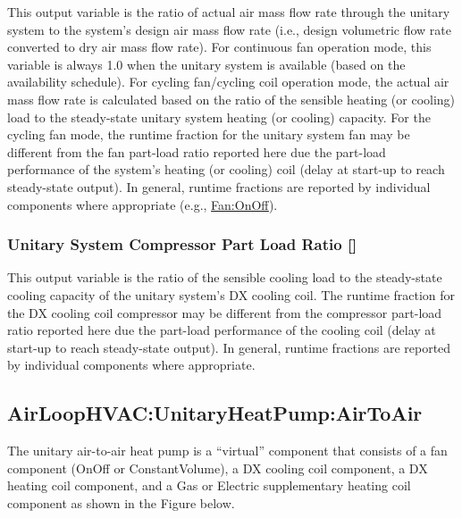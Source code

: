 This output variable is the ratio of actual air mass flow rate through the unitary system to the system's design air mass flow rate (i.e., design volumetric flow rate converted to dry air mass flow rate). For continuous fan operation mode, this variable is always 1.0 when the unitary system is available (based on the availability schedule). For cycling fan/cycling coil operation mode, the actual air mass flow rate is calculated based on the ratio of the sensible heating (or cooling) load to the steady-state unitary system heating (or cooling) capacity. For the cycling fan mode, the runtime fraction for the unitary system fan may be different from the fan part-load ratio reported here due the part-load performance of the system's heating (or cooling) coil (delay at start-up to reach steady-state output). In general, runtime fractions are reported by individual components where appropriate (e.g., \hyperref[fanonoff]{Fan:OnOff}).

\subsubsection{Unitary System Compressor Part Load Ratio {[]}}\label{unitary-system-compressor-part-load-ratio-1}

This output variable is the ratio of the sensible cooling load to the steady-state cooling capacity of the unitary system's DX cooling coil. The runtime fraction for the DX cooling coil compressor may be different from the compressor part-load ratio reported here due the part-load performance of the cooling coil (delay at start-up to reach steady-state output). In general, runtime fractions are reported by individual components where appropriate.

\subsection{AirLoopHVAC:UnitaryHeatPump:AirToAir}\label{airloophvacunitaryheatpumpairtoair}

The unitary air-to-air heat pump is a ``virtual'' component that consists of a fan component (OnOff or ConstantVolume), a DX cooling coil component, a DX heating coil component, and a Gas or Electric supplementary heating coil component as shown in the Figure below.

